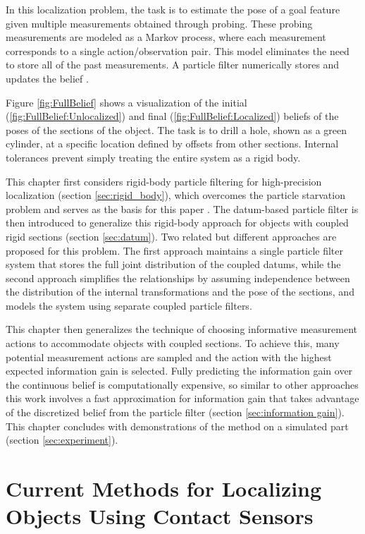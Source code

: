 \documentclass[../thesis.tex]{subfiles}
\begin{document}
In this localization problem, the task is to estimate the pose of a goal feature given multiple measurements obtained through probing. 
These probing measurements are modeled as a Markov process, where each measurement corresponds to a single action/observation pair. 
This model eliminates the need to store all of the past measurements. 
A particle filter numerically stores and updates the belief \cite{Thrun2000a}.

Figure \ref{fig:FullBelief} shows a visualization of the initial (\ref{fig:FullBelief:Unlocalized}) and final (\ref{fig:FullBelief:Localized}) beliefs of the poses of the sections of the object.
The task is to drill a hole, shown as a green cylinder, at a specific location defined by offsets from other sections.
Internal tolerances prevent simply treating the entire system as a rigid body.


This chapter first considers rigid-body particle filtering for high-precision localization (section \ref{sec:rigid_body}), which overcomes the particle starvation problem and serves as the basis for this paper \cite{Saund2017}. 
The datum-based particle filter is then introduced to generalize this rigid-body approach for objects with coupled rigid sections (section \ref{sec:datum}).
Two related but different approaches are proposed for this problem.
The first approach maintains a single particle filter system that stores the full joint distribution of the coupled datums, while the second approach simplifies the relationships by assuming independence between the distribution of the internal transformations and the pose of the sections, and models the system using separate coupled particle filters. 

This chapter then generalizes the technique of choosing informative measurement actions to accommodate objects with coupled sections.
To achieve this, many potential measurement actions are sampled and the action with the highest expected information gain is selected. 
Fully predicting the information gain over the continuous belief is computationally expensive, so similar to other approaches \cite{Javdani2013} this work involves a fast approximation for information gain that takes advantage of the discretized belief from the particle filter (section \ref{sec:information gain}). 
This chapter concludes with demonstrations of the method on a simulated part (section \ref{sec:experiment}). 

\section{Current Methods for Localizing Objects Using Contact Sensors}
\end{document}
